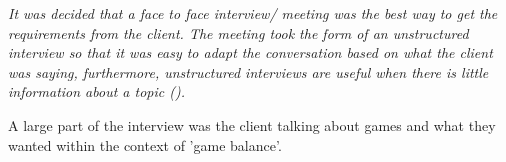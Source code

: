 \textit{It was decided that a face to face interview/ meeting was the best way to get the requirements from the client. The meeting took the form of an unstructured interview so that it was easy to adapt the conversation based on what the client was saying, furthermore, unstructured interviews are useful when there is little information about a topic (\cite{easwaramoorthy2006interviewing}). }

A large part of the interview was the client talking about games and what they wanted within the context of 'game balance'.  